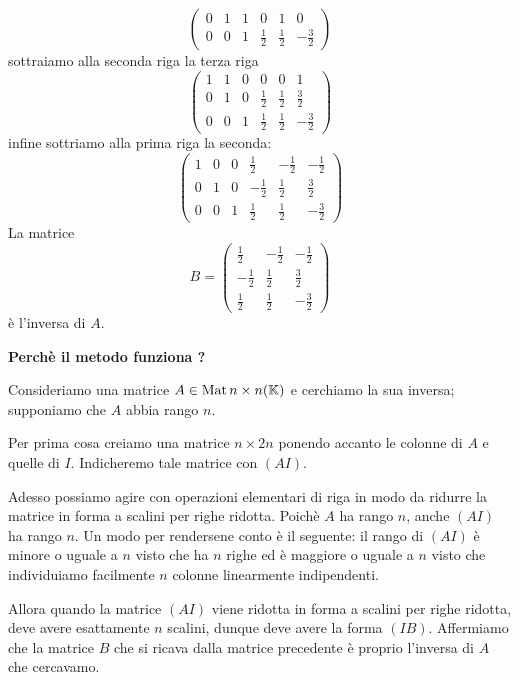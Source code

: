 \begin{example}
\[\begin{pmatrix}
			0 & 1 & 1 & 0           & 1           & 0            \\
			0 & 0 & 1 & \frac{1}{2} & \frac{1}{2} & -\frac{3}{2}
		\end{pmatrix}
	\]
	sottraiamo alla seconda riga la terza riga
	\[
		\begin{pmatrix}
			1 & 1 & 0 & 0           & 0           & 1            \\
			0 & 1 & 0 & \frac{1}{2} & \frac{1}{2} & \frac{3}{2}  \\
			0 & 0 & 1 & \frac{1}{2} & \frac{1}{2} & -\frac{3}{2}
		\end{pmatrix}
	\]
	infine sottriamo alla prima riga la seconda:
	\[
		\begin{pmatrix}
			1 & 0 & 0 & \frac{1}{2}  & -\frac{1}{2} & -\frac{1}{2} \\
			0 & 1 & 0 & -\frac{1}{2} & \frac{1}{2}  & \frac{3}{2}  \\
			0 & 0 & 1 & \frac{1}{2}  & \frac{1}{2}  & -\frac{3}{2}
		\end{pmatrix}
	\]
	La matrice
	\[
		B = \begin{pmatrix}
			\frac{1}{2}  & -\frac{1}{2} & -\frac{1}{2} \\
			-\frac{1}{2} & \frac{1}{2}  & \frac{3}{2}  \\
			\frac{1}{2}  & \frac{1}{2}  & -\frac{3}{2}
		\end{pmatrix}
	\]
	è l'inversa di $A$.
\end{example}

\textbf{Perchè il metodo funziona ?}

Consideriamo una matrice $A \in \operatorname{Mat}{n \times n}(\mathbb{K})$ e cerchiamo la sua
inversa; supponiamo che $A$ abbia rango $n$.

Per prima cosa creiamo una matrice $n \times 2n$ ponendo accanto le colonne di $A$
e quelle di $I$. Indicheremo tale matrice con $(A I)$.

Adesso possiamo agire con operazioni elementari di riga in modo da ridurre la
matrice in forma a scalini per righe ridotta. Poichè $A$ ha rango $n$, anche
$(A I)$ ha rango $n$. Un modo per rendersene conto è il seguente: il rango di
$(A I)$ è minore o uguale a $n$ visto che ha $n$ righe ed è maggiore o uguale
a $n$ visto che individuiamo facilmente $n$ colonne linearmente indipendenti.

Allora quando la matrice $(A I)$ viene ridotta in forma a scalini per righe ridotta,
deve avere esattamente $n$ scalini, dunque deve avere la forma $(I B)$.
Affermiamo che la matrice $B$ che si ricava dalla matrice precedente è proprio
l'inversa di $A$ che cercavamo.


